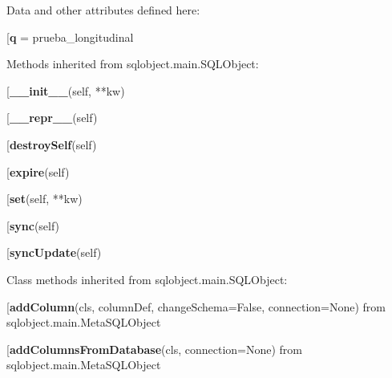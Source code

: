Data and other attributes defined here:\\
\begin{description}\item[{\bf q} = prueba\_longitudinal\end{description}


Methods inherited from sqlobject.main.SQLObject:\\
\begin{description}\item[{\bf \_\_init\_\_}(self, **kw)\end{description}

\begin{description}\item[{\bf \_\_repr\_\_}(self)\end{description}

\begin{description}\item[{\bf destroySelf}(self)\end{description}

\begin{description}\item[{\bf expire}(self)\end{description}

\begin{description}\item[{\bf set}(self, **kw)\end{description}

\begin{description}\item[{\bf sync}(self)\end{description}

\begin{description}\item[{\bf syncUpdate}(self)\end{description}


Class methods inherited from sqlobject.main.SQLObject:\\
\begin{description}\item[{\bf addColumn}(cls, columnDef, changeSchema=False, connection=None) from sqlobject.main.MetaSQLObject\end{description}

\begin{description}\item[{\bf addColumnsFromDatabase}(cls, connection=None) from sqlobject.main.MetaSQLObject\end{description}

